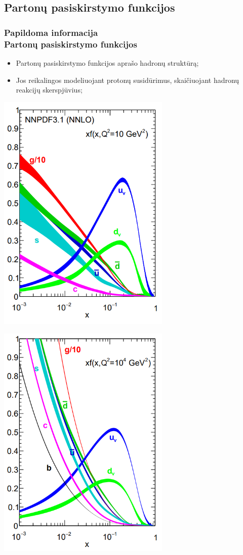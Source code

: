 \documentclass[xcolor=dvipsnames]{beamer}
\begin{document}
\begin{frame}
\subsection{Partonų pasiskirstymo funkcijos}
	\frametitle{Papildoma informacija\\ \small Partonų pasiskirstymo funkcijos}
	\begin{itemize}
		\small
		\item Partonų pasiskirstymo funkcijos aprašo hadronų struktūrą;
		\item Jos reikalingos modeliuojant protonų susidūrimus, skaičiuojant hadronų reakcijų skerspjūvius;
	\end{itemize}
	\centering
	\begin{minipage}{0.49\textwidth}
		\centering
		\includegraphics[width=0.62\textwidth]{NNPDF10.PNG}
	\end{minipage}
	\hfill
	\begin{minipage}{0.49\textwidth}
		\centering
		\includegraphics[width=0.62\textwidth]{NNPDF10000.PNG}

\end{minipage}
\end{frame}
\end{document}
